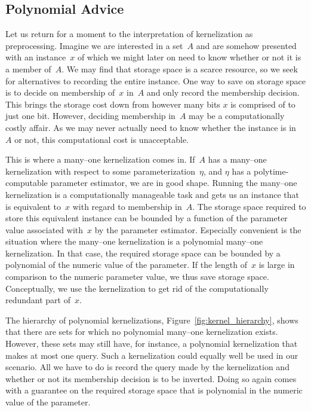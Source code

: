 \subsection{Polynomial Advice}
\label{sec:redundancy:advice}%
Let us return for a moment to the interpretation of kernelization as preprocessing.
Imagine we are interested in a set~$A$ and are somehow presented with an instance~$x$ of which we might later on need to know whether or not it is a member of~$A$.
We may find that storage space is a scarce resource, so we seek for alternatives to recording the entire instance.
One way to save on storage space is to decide on membership of~$x$ in~$A$ and only record the membership decision.
This brings the storage cost down from however many bits $x$ is comprised of to just one bit.
However, deciding membership in~$A$ may be a computationally costly affair.
As we may never actually need to know whether the instance is in~$A$ or not, this computational cost is unacceptable.

This is where a many--one kernelization comes in.
If~$A$ has a many--one kernelization with respect to some parameterization~$\eta$, and $\eta$ has a polytime-computable parameter estimator, we are in good shape.
Running the many--one kernelization is a computationally manageable task and gets us an instance that is equivalent to~$x$ with regard to membership in~$A$.
The storage space required to store this equivalent instance can be bounded by a function of the parameter value associated with~$x$ by the parameter estimator.
Especially convenient is the situation where the many--one kernelization is a polynomial many--one kernelization.
In that case, the required storage space can be bounded by a polynomial of the numeric value of the parameter.
If the length of~$x$ is large in comparison to the numeric parameter value, we thus save storage space.
Conceptually, we use the kernelization to get rid of the computationally redundant part of~$x$.

The hierarchy of polynomial kernelizations, Figure~\ref{fig:kernel_hierarchy}, shows that there are sets for which no polynomial many--one kernelization exists.
However, these sets may still have, for instance, a polynomial kernelization that makes at most one query.
Such a kernelization could equally well be used in our scenario.
All we have to do is record the query made by the kernelization and whether or not its membership decision is to be inverted.
Doing so again comes with a guarantee on the required storage space that is polynomial in the numeric value of the parameter.

